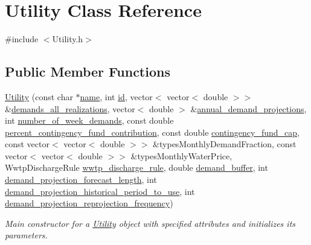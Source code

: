 \hypertarget{classUtility}{}\section{Utility Class Reference}
\label{classUtility}


{\ttfamily \#include $<$Utility.\+h$>$}

\subsection*{Public Member Functions}
\begin{DoxyCompactItemize}
\item 
\mbox{\hyperlink{classUtility_a53fb19e5a344de5892c5cfbcc1225da9}{Utility}} (const char $\ast$\mbox{\hyperlink{classUtility_ad0ce5c179a7f5ceb46d4fcae08dbfb47}{name}}, int \mbox{\hyperlink{classUtility_ad41c4ea5c911c5000452a3371cd65d5f}{id}}, vector$<$ vector$<$ double $>$$>$ \&\mbox{\hyperlink{classUtility_a8ffed6cb590d6f0855128828c3f289b8}{demands\+\_\+all\+\_\+realizations}}, vector$<$ double $>$ \&\mbox{\hyperlink{classUtility_af260b06faba5238fe33687eff5ff1570}{annual\+\_\+demand\+\_\+projections}}, int \mbox{\hyperlink{classUtility_a0548db3746582251082aa430db49dad0}{number\+\_\+of\+\_\+week\+\_\+demands}}, const double \mbox{\hyperlink{classUtility_a7b1a097ec188be8e7175d058b5e6596c}{percent\+\_\+contingency\+\_\+fund\+\_\+contribution}}, const double \mbox{\hyperlink{classUtility_acad95d9c3155e6079281f3afefe03359}{contingency\+\_\+fund\+\_\+cap}}, const vector$<$ vector$<$ double $>$$>$ \&types\+Monthly\+Demand\+Fraction, const vector$<$ vector$<$ double $>$$>$ \&types\+Monthly\+Water\+Price, Wwtp\+Discharge\+Rule \mbox{\hyperlink{classUtility_a0c598532230472e8106f6a71f97ea62d}{wwtp\+\_\+discharge\+\_\+rule}}, double \mbox{\hyperlink{classUtility_a4be9760339ec06e5c932890da8e566b3}{demand\+\_\+buffer}}, int \mbox{\hyperlink{classUtility_a50fd81c790bf79ac989effa1bd3edaec}{demand\+\_\+projection\+\_\+forecast\+\_\+length}}, int \mbox{\hyperlink{classUtility_a8a23a796bff4447ae20a1cd3e97661c1}{demand\+\_\+projection\+\_\+historical\+\_\+period\+\_\+to\+\_\+use}}, int \mbox{\hyperlink{classUtility_a1cfe05e6efb78a67e32e5849ee0918d5}{demand\+\_\+projection\+\_\+reprojection\+\_\+frequency}})
\begin{DoxyCompactList}\small\item\em Main constructor for a \mbox{\hyperlink{classUtility}{Utility}} object with specified attributes and initializes its parameters. \end{DoxyCompactList}\item 
$$
\end{DoxyCompactItemize}
